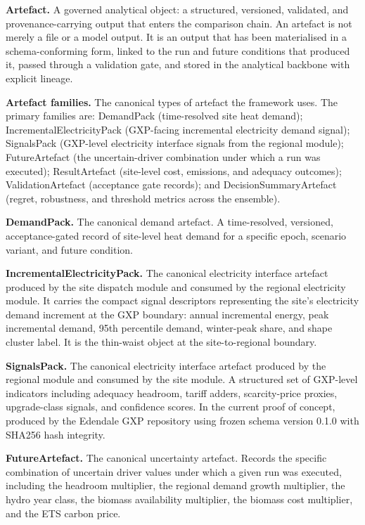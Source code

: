 \documentclass[
  11pt,
  a4paper,
  twoside,
  openright]{scrbook}
\begin{document}
\textbf{Artefact.} A governed analytical object: a structured,
versioned, validated, and provenance-carrying output that enters the
comparison chain. An artefact is not merely a file or a model output. It
is an output that has been materialised in a schema-conforming form,
linked to the run and future conditions that produced it, passed through
a validation gate, and stored in the analytical backbone with explicit
lineage.

\textbf{Artefact families.} The canonical types of artefact the
framework uses. The primary families are: DemandPack (time-resolved site
heat demand); IncrementalElectricityPack (GXP-facing incremental
electricity demand signal); SignalsPack (GXP-level electricity interface
signals from the regional module); FutureArtefact (the uncertain-driver
combination under which a run was executed); ResultArtefact (site-level
cost, emissions, and adequacy outcomes); ValidationArtefact (acceptance
gate records); and DecisionSummaryArtefact (regret, robustness, and
threshold metrics across the ensemble).

\textbf{DemandPack.} The canonical demand artefact. A time-resolved,
versioned, acceptance-gated record of site-level heat demand for a
specific epoch, scenario variant, and future condition.

\textbf{IncrementalElectricityPack.} The canonical electricity interface
artefact produced by the site dispatch module and consumed by the
regional electricity module. It carries the compact signal descriptors
representing the site's electricity demand increment at the GXP
boundary: annual incremental energy, peak incremental demand, 95th
percentile demand, winter-peak share, and shape cluster label. It is the
thin-waist object at the site-to-regional boundary.

\textbf{SignalsPack.} The canonical electricity interface artefact
produced by the regional module and consumed by the site module. A
structured set of GXP-level indicators including adequacy headroom,
tariff adders, scarcity-price proxies, upgrade-class signals, and
confidence scores. In the current proof of concept, produced by the
Edendale GXP repository using frozen schema version 0.1.0 with SHA256
hash integrity.

\textbf{FutureArtefact.} The canonical uncertainty artefact. Records the
specific combination of uncertain driver values under which a given run
was executed, including the headroom multiplier, the regional demand
growth multiplier, the hydro year class, the biomass availability
multiplier, the biomass cost multiplier, and the ETS carbon price.
\end{document}
